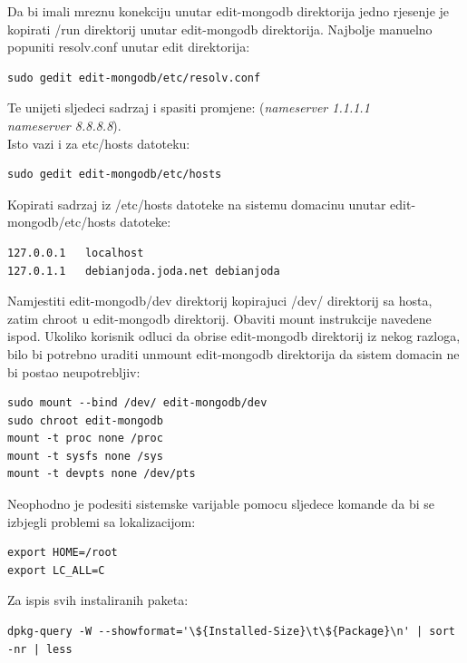 \documentclass[12pt,vi]{mitthesis}
\begin{document}
\noindent
Da bi imali mreznu konekciju unutar edit-mongodb direktorija jedno rjesenje je kopirati /run direktorij unutar edit-mongodb direktorija.
Najbolje manuelno popuniti resolv.conf unutar edit direktorija:
\begin{lstlisting}[style=BashInputStyle]
sudo gedit edit-mongodb/etc/resolv.conf
\end{lstlisting}
Te unijeti sljedeci sadrzaj i spasiti promjene:
(\textit{nameserver 1.1.1.1 \\
nameserver 8.8.8.8}).\\
\noindent
Isto vazi i za etc/hosts datoteku:
\begin{lstlisting}[style=BashInputStyle]
sudo gedit edit-mongodb/etc/hosts
\end{lstlisting}
Kopirati sadrzaj iz /etc/hosts datoteke na sistemu domacinu unutar edit-mongodb/etc/hosts datoteke:
\begin{lstlisting}
127.0.0.1	localhost
127.0.1.1	debianjoda.joda.net	debianjoda
\end{lstlisting}
\noindent
Namjestiti edit-mongodb/dev direktorij kopirajuci /dev/ direktorij sa hosta, zatim chroot u edit-mongodb direktorij.
Obaviti mount instrukcije navedene ispod. Ukoliko korisnik odluci da obrise edit-mongodb direktorij iz nekog razloga,
bilo bi potrebno uraditi unmount edit-mongodb direktorija da sistem domacin ne bi postao neupotrebljiv:
\begin{lstlisting}[style=BashInputStyle]
sudo mount --bind /dev/ edit-mongodb/dev
sudo chroot edit-mongodb
mount -t proc none /proc
mount -t sysfs none /sys
mount -t devpts none /dev/pts
\end{lstlisting}

\noindent
Neophodno je podesiti sistemske varijable pomocu sljedece komande da bi se izbjegli problemi sa lokalizacijom:
\begin{lstlisting}[style=BashInputStyle]
export HOME=/root
export LC_ALL=C
\end{lstlisting}

\noindent
Za ispis svih instaliranih paketa:
\begin{lstlisting}[style=BashInputStyle]
dpkg-query -W --showformat='\${Installed-Size}\t\${Package}\n' | sort -nr | less
\end{lstlisting}
\end{document}
